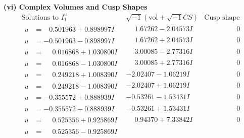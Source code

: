 \documentclass[1p]{elsarticle_modified}
\theoremstyle{definition}
\newcommand{\I}{\sqrt{-1}}
\begin{document}
\newpage\flushleft \textbf{(vi) Complex Volumes and Cusp Shapes}
$$\begin{array}{c|c|c}  
\text{Solutions to }I^u_{1}& \I (\text{vol} + \sqrt{-1}CS) & \text{Cusp shape}\\
 \hline 
\begin{aligned}
u &= -0.501963 + 0.898997 I\end{aligned}
 & \phantom{-}1.67262 - 2.04573 I & \phantom{-0.000000 } 0 \\ \hline\begin{aligned}
u &= -0.501963 - 0.898997 I\end{aligned}
 & \phantom{-}1.67262 + 2.04573 I & \phantom{-0.000000 } 0 \\ \hline\begin{aligned}
u &= \phantom{-}0.016868 + 1.030800 I\end{aligned}
 & \phantom{-}3.00085 - 2.77316 I & \phantom{-0.000000 } 0 \\ \hline\begin{aligned}
u &= \phantom{-}0.016868 - 1.030800 I\end{aligned}
 & \phantom{-}3.00085 + 2.77316 I & \phantom{-0.000000 } 0 \\ \hline\begin{aligned}
u &= \phantom{-}0.249218 + 1.008390 I\end{aligned}
 & -2.02407 - 1.06219 I & \phantom{-0.000000 } 0 \\ \hline\begin{aligned}
u &= \phantom{-}0.249218 - 1.008390 I\end{aligned}
 & -2.02407 + 1.06219 I & \phantom{-0.000000 } 0 \\ \hline\begin{aligned}
u &= -0.355572 + 0.888939 I\end{aligned}
 & -0.53261 - 1.53431 I & \phantom{-0.000000 } 0 \\ \hline\begin{aligned}
u &= -0.355572 - 0.888939 I\end{aligned}
 & -0.53261 + 1.53431 I & \phantom{-0.000000 } 0 \\ \hline\begin{aligned}
u &= \phantom{-}0.525356 + 0.925869 I\end{aligned}
 & \phantom{-}0.94370 + 7.33842 I & \phantom{-0.000000 } 0 \\ \hline\begin{aligned}
u &= \phantom{-}0.525356 - 0.925869 I\end{aligned}

\end{array}$$
\end{document}
